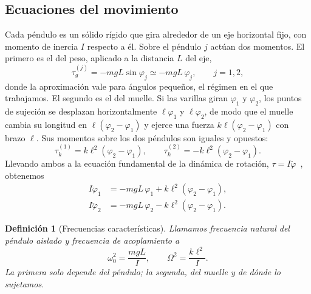 \documentclass[a4paper,11pt]{amsart}
\numberwithin{equation}{section}
\theoremstyle{cienplano}
\theoremstyle{ciendef}
\newtheorem{definicion}[proposicion]{Definición}
\theoremstyle{cienobs}
\begin{document}
\subsection{Ecuaciones del movimiento}\label{sec:ecuaciones}
Cada péndulo es un sólido rígido que gira alrededor de un eje horizontal fijo,
con momento de inercia $I$ respecto a él. Sobre el péndulo $j$ actúan dos
momentos. El primero es el del peso, aplicado a la distancia $L$ del eje,
\begin{equation}\label{eq:peso}
  \tau_{g}^{(j)}=-mgL\sin\varphi_j\simeq-mgL\,\varphi_j ,
  \qquad j=1,2,
\end{equation}
donde la aproximación vale para ángulos pequeños, el régimen en el que
trabajamos. El segundo es el del muelle. Si las varillas giran $\varphi_1$ y
$\varphi_2$, los puntos de sujeción se desplazan horizontalmente
$\ell\varphi_1$ y $\ell\varphi_2$, de modo que el muelle cambia su longitud en
$\ell(\varphi_2-\varphi_1)$ y ejerce una fuerza $k\ell(\varphi_2-\varphi_1)$ con
brazo $\ell$. Sus momentos sobre los dos péndulos son iguales y opuestos:
\begin{equation}\label{eq:muelle}
  \tau_{k}^{(1)}=k\ell^{2}(\varphi_2-\varphi_1),
  \qquad
  \tau_{k}^{(2)}=-k\ell^{2}(\varphi_2-\varphi_1).
\end{equation}
Llevando ambos a la ecuación fundamental de la dinámica de rotación,
$\tau=I\ddot\varphi$~\cite{GUION-P3}, obtenemos
\begin{equation}\label{eq:acopladas}
\begin{aligned}
  I\ddot\varphi_1&=-mgL\,\varphi_1+k\ell^{2}(\varphi_2-\varphi_1),\\
  I\ddot\varphi_2&=-mgL\,\varphi_2-k\ell^{2}(\varphi_2-\varphi_1).
\end{aligned}
\end{equation}

\begin{definicion}[Frecuencias características]\label{def:frecuencias}
Llamamos \emph{frecuencia natural} del péndulo aislado y \emph{frecuencia de
acoplamiento} a
\begin{equation}\label{eq:defs}
  \omega_0^{2}=\frac{mgL}{I},
  \qquad
  \Omega^{2}=\frac{k\ell^{2}}{I}.
\end{equation}
La primera solo depende del péndulo; la segunda, del muelle y de dónde lo
sujetamos.
\end{definicion}
\end{document}
